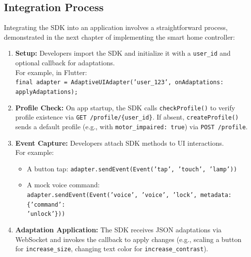 \documentclass[openany]{book}
\begin{document}
\subsection{Integration Process}
Integrating the SDK into an application involves a straightforward process, demonstrated in the next chapter of implementing the smart home controller:
\begin{enumerate}
    \item \textbf{Setup:} Developers import the SDK and initialize it with a \texttt{user\_id} and optional callback for adaptations. \\
    For example, in Flutter: \\
    \texttt{final adapter = AdaptiveUIAdapter('user\_123', onAdaptations: applyAdaptations);}

    \item \textbf{Profile Check:} On app startup, the SDK calls \texttt{checkProfile()} to verify profile existence via \texttt{GET /profile/\{user\_id\}}. If absent, \texttt{createProfile()} sends a default profile (e.g., with \texttt{motor\_impaired: true}) via \texttt{POST /profile}.

    \item \textbf{Event Capture:} Developers attach SDK methods to UI interactions. \\
    For example:
    \begin{itemize}
        \item A button tap: \texttt{adapter.sendEvent(Event('tap', 'touch', 'lamp'))}
        \item A mock voice command: \\ \texttt{adapter.sendEvent(Event('voice', 'voice', 'lock', metadata: \{'command': \\ 'unlock'\}))}
    \end{itemize}

    \item \textbf{Adaptation Application:} The SDK receives JSON adaptations via WebSocket and invokes the callback to apply changes (e.g., scaling a button for \texttt{increase\_size}, changing text color for \texttt{increase\_contrast}).

\end{enumerate}
\end{document}

